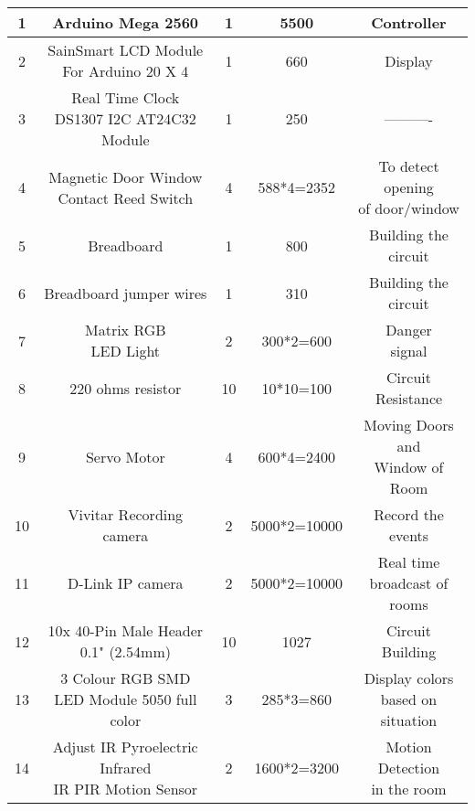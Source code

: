 \documentclass[margin, centered]{res}
\begin{document}
\begin{resume}
\begin{table}[ht]
\begin{tabular}{|c |c |c |c |c|}
1 & Arduino Mega 2560 & 1 & 5500 & Controller\\ \hline
2 & \makecell{SainSmart LCD Module \\ For Arduino 20 X 4} & 1 & 660 & Display\\ \hline
3 & \makecell{Real Time Clock \\ DS1307 I2C AT24C32 Module} & 1 & 250 & ----------\\ \hline
4 & \makecell{Magnetic Door Window \\ Contact Reed Switch} & 4 & 588*4=2352 & \makecell{To detect opening \\of door/window} \\ \hline
5 & Breadboard & 1 & 800 & \makecell{Building the \\circuit}\\ \hline
6 & Breadboard jumper wires & 1 & 310 & \makecell{Building the \\circuit}\\ \hline
7 & \makecell{Matrix RGB \\LED Light} & 2 & 300*2=600 & \makecell{Danger\\signal}\\ \hline
8 & 220 ohms resistor & 10 & 10*10=100 & \makecell{Circuit \\Resistance}\\ \hline
9 & Servo Motor & 4 & 600*4=2400 & \makecell{Moving Doors and \\Window of Room}\\ \hline
10 & Vivitar Recording camera & 2 & 5000*2=10000 & Record the events\\ \hline
11 & D-Link IP camera & 2 & 5000*2=10000 & \makecell{Real time \\broadcast of rooms}\\ \hline
12 & 10x 40-Pin Male Header 0.1" (2.54mm) & 10 & 1027 & Circuit Building \\ \hline
13 & \makecell{3 Colour RGB SMD \\LED Module 5050 full color} & 3 & 285*3=860 & \makecell{Display colors \\based on situation}\\ \hline
14 & \makecell{Adjust IR Pyroelectric Infrared \\IR PIR Motion Sensor} & 2 & 1600*2=3200 & \makecell{Motion Detection \\in the room}\\ \hline

\end{tabular}
\end{table}
\end{resume}
\end{document}
